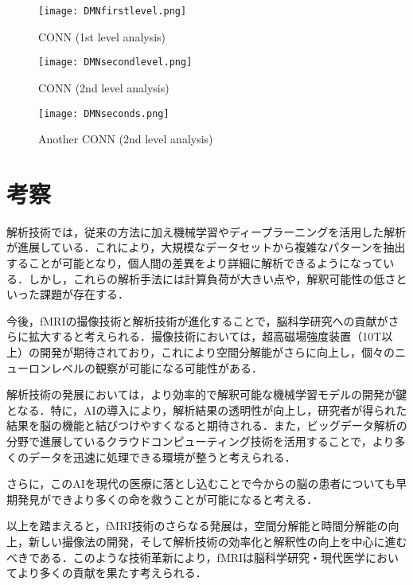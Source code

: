 \documentclass{jlreq}
\begin{document}
\begin{enumerate}
\begin{enumerate}
\begin{enumerate}
\begin{enumerate}
\begin{figure}[H]
    \centering
        \begin{minipage}{0.25\textwidth}
        \centering
        \texttt{[image: DMNfirstlevel.png]}
        \caption{CONN (1st level analysis)}
        \label{fig:brain_T1}
    \end{minipage}
    \hfill
    \begin{minipage}{0.2\textwidth}
        \centering
        \texttt{[image: DMNsecondlevel.png]}
        \caption{CONN (2nd level analysis)}
        \label{fig:brain_T1}
    \end{minipage}
    \hfill
    \begin{minipage}{0.2\textwidth}
        \centering
        \texttt{[image: DMNseconds.png]}
        \caption{Another CONN (2nd level analysis)}
        \label{fig:brain_EPI}
    \end{minipage}
\end{figure}
\section{考察}
解析技術では，従来の方法に加え機械学習やディープラーニングを活用した解析が進展している．これにより，大規模なデータセットから複雑なパターンを抽出することが可能となり，個人間の差異をより詳細に解析できるようになっている．しかし，これらの解析手法には計算負荷が大きい点や，解釈可能性の低さといった課題が存在する．

今後，fMRIの撮像技術と解析技術が進化することで，脳科学研究への貢献がさらに拡大すると考えられる．撮像技術においては，超高磁場強度装置（10T以上）の開発が期待されており，これにより空間分解能がさらに向上し，個々のニューロンレベルの観察が可能になる可能性がある．

解析技術の発展においては，より効率的で解釈可能な機械学習モデルの開発が鍵となる．特に，AIの導入により，解析結果の透明性が向上し，研究者が得られた結果を脳の機能と結びつけやすくなると期待される．また，ビッグデータ解析の分野で進展しているクラウドコンピューティング技術を活用することで，より多くのデータを迅速に処理できる環境が整うと考えられる．

さらに，このAIを現代の医療に落とし込むことで今からの脳の患者についても早期発見ができより多くの命を救うことが可能になると考える．

以上を踏まえると，fMRI技術のさらなる発展は，空間分解能と時間分解能の向上，新しい撮像法の開発，そして解析技術の効率化と解釈性の向上を中心に進むべきである．このような技術革新により，fMRIは脳科学研究・現代医学においてより多くの貢献を果たす考えられる．


\end{enumerate}
\end{enumerate}
\end{enumerate}
\end{enumerate}
\end{document}
